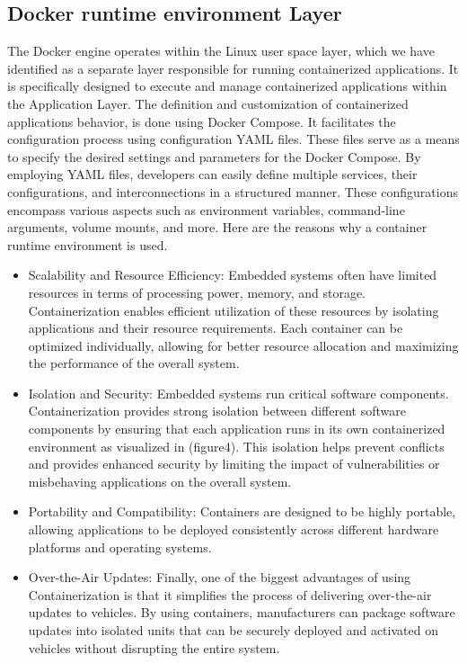 \documentclass[
12pt,
oneside, 
onehalfspacing, 
nolistspacing, 
parskip, 
chapterinoneline, 
]{AASTCOMPUTER}
\begin{document}
\subsection{Docker runtime environment Layer}
The Docker engine operates within the Linux user space layer, which we have identified as a separate layer responsible for running containerized applications. It is specifically designed to execute and manage containerized applications within the Application Layer.  The definition and customization of containerized applications behavior, is done using Docker Compose. It facilitates the configuration process using configuration YAML files. These files serve as a means to specify the desired settings and parameters for the Docker Compose. By employing YAML files, developers can easily define multiple services, their configurations, and interconnections in a structured manner. These configurations encompass various aspects such as environment variables, command-line arguments, volume mounts, and more. Here are the reasons why a container runtime environment is used.
\begin{itemize}
  \item Scalability and Resource Efficiency: Embedded systems often have limited resources in terms of processing power, memory, and storage. Containerization enables efficient utilization of these resources by isolating applications and their resource requirements. Each container can be optimized individually, allowing for better resource allocation and maximizing the performance of the overall system.
  
  \item Isolation and Security: Embedded systems run critical software components. Containerization provides strong isolation between different software components by ensuring that each application runs in its own containerized environment as visualized in (figure4). This isolation helps prevent conflicts and provides enhanced security by limiting the impact of vulnerabilities or misbehaving applications on the overall system.
  
  \item Portability and Compatibility: Containers are designed to be highly portable, allowing applications to be deployed consistently across different hardware platforms and operating systems.
  
  \item Over-the-Air Updates: Finally, one of the biggest advantages of using Containerization is that it simplifies the process of delivering over-the-air updates to vehicles. By using containers, manufacturers can package software updates into isolated units that can be securely deployed and activated on vehicles without disrupting the entire system.
\end{itemize}
\end{document}
